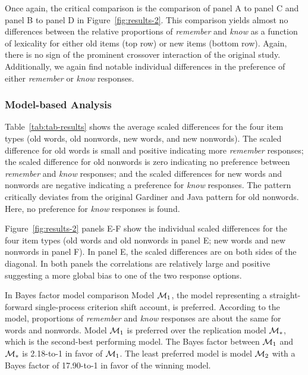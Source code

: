 \documentclass[english,,man,floatsintext]{apa6}
\begin{document}
Once again, the critical comparison is the comparison of panel A to panel C and panel B to panel D in Figure~\ref{fig:results-2}. This comparison yields almost no differences between the relative proportions of \emph{remember} and \emph{know} as a function of lexicality for either old items (top row) or new items (bottom row). Again, there is no sign of the prominent crossover interaction of the original study. Additionally, we again find notable individual differences in the preference of either \emph{remember} or \emph{know} responses.

\hypertarget{model-based-analysis-1}{%
\subsubsection{Model-based Analysis}\label{model-based-analysis-1}}

Table~\ref{tab:tab-results} shows the average scaled differences for the four item types (old words, old nonwords, new words, and new nonwords). The scaled difference for old words is small and positive indicating more \emph{remember} responses; the scaled difference for old nonwords is zero indicating no preference between \emph{remember} and \emph{know} responses; and the scaled differences for new words and nonwords are negative indicating a preference for \emph{know} responses. The pattern critically deviates from the original Gardiner and Java pattern for old nonwords. Here, no preference for \emph{know} responses is found.

Figure~\ref{fig:results-2} panels E-F show the individual scaled differences for the four item types (old words and old nonwords in panel E; new words and new nonwords in panel F). In panel E, the scaled differences are on both sides of the diagonal. In both panels the correlations are relatively large and positive suggesting a more global bias to one of the two response options.

In Bayes factor model comparison Model \({\cal M}_{1}\), the model representing a straight-forward single-process criterion shift account, is preferred. According to the model, proportions of \emph{remember} and \emph{know} responses are about the same for words and nonwords. Model \({\cal M}_{1}\) is preferred over the replication model \({\cal M}_{*}\), which is the second-best performing model. The Bayes factor between \({\cal M}_{1}\) and \({\cal M}_{*}\) is 2.18-to-1 in favor of \({\cal M}_{1}\). The least preferred model is model \({\cal M}_2\) with a Bayes factor of 17.90-to-1 in favor of the winning model.
\end{document}

